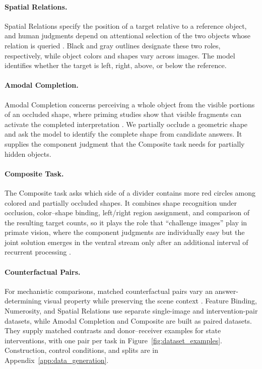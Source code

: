 \documentclass{article} %
\begin{document}
\paragraph{Spatial Relations.}
Spatial Relations specify the position of a target relative to a reference object, and human judgments depend on attentional selection of the two objects whose relation is queried \citep{carlson1999what,logan1994spatial}. Black and gray outlines designate these two roles, respectively, while object colors and shapes vary across images. The model identifies whether the target is left, right, above, or below the reference.

\paragraph{Amodal Completion.}
Amodal Completion concerns perceiving a whole object from the visible portions of an occluded shape, where priming studies show that visible fragments can activate the completed interpretation \citep{kellman1991theory,sekuler1992perception}. We partially occlude a geometric shape and ask the model to identify the complete shape from candidate answers. It supplies the component judgment that the Composite task needs for partially hidden objects.

\paragraph{Composite Task.}
The Composite task asks which side of a divider contains more red circles among colored and partially occluded shapes. It combines shape recognition under occlusion, color--shape binding, left/right region assignment, and comparison of the resulting target counts, so it plays the role that ``challenge images'' play in primate vision, where the component judgments are individually easy but the joint solution emerges in the ventral stream only after an additional interval of recurrent processing \citep{kar2019evidence,kar2021fast}.


\paragraph{Counterfactual Pairs.}
For mechanistic comparisons, matched counterfactual pairs vary an answer-determining visual property while preserving the scene context \citep{gardner2020evaluating,bitton2021automatic}. Feature Binding, Numerosity, and Spatial Relations use separate single-image and intervention-pair datasets, while Amodal Completion and Composite are built as paired datasets. They supply matched contrasts and donor--receiver examples for state interventions, with one pair per task in Figure~\ref{fig:dataset_examples}. Construction, control conditions, and splits are in Appendix~\ref{app:data_generation}.
\end{document}
